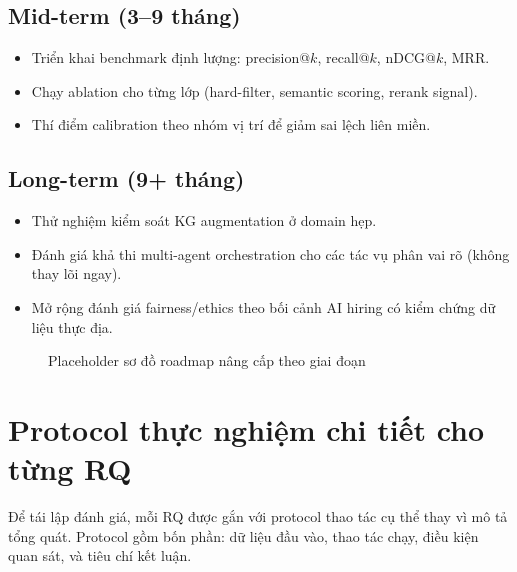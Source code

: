 \subsection{Mid-term (3--9 tháng)}

\begin{itemize}
  \item Triển khai benchmark định lượng: precision@$k$, recall@$k$, nDCG@$k$, MRR.
  \item Chạy ablation cho từng lớp (hard-filter, semantic scoring, rerank signal).
  \item Thí điểm calibration theo nhóm vị trí để giảm sai lệch liên miền.
\end{itemize}

\subsection{Long-term (9+ tháng)}

\begin{itemize}
  \item Thử nghiệm kiểm soát KG augmentation ở domain hẹp.
  \item Đánh giá khả thi multi-agent orchestration cho các tác vụ phân vai rõ (không thay lõi ngay).
  \item Mở rộng đánh giá fairness/ethics theo bối cảnh AI hiring có kiểm chứng dữ liệu thực địa.
\end{itemize}

\begin{figure}[H]
\centering
{}
\caption{Placeholder sơ đồ roadmap nâng cấp theo giai đoạn}
\label{fig:roadmap-3phase-placeholder}
\end{figure}

\section{Protocol thực nghiệm chi tiết cho từng RQ}

Để tái lập đánh giá, mỗi RQ được gắn với protocol thao tác cụ thể thay vì mô tả tổng quát. Protocol gồm bốn phần: dữ liệu đầu vào, thao tác chạy, điều kiện quan sát, và tiêu chí kết luận.

